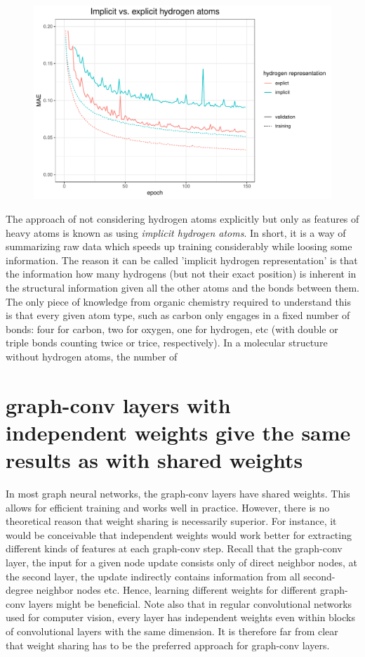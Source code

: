 \begin{figure}[H]
	\includegraphics[width=\linewidth]{figures/implict-hydrogens.pdf}
	
	\caption{}
	\label{fig:implicit-hydrogens}
\end{figure}


The approach of not considering hydrogen atoms explicitly but only as features of heavy atoms is known as using \textit{implicit hydrogen atoms}. In short, it is a way of summarizing raw data which speeds up training considerably while loosing some information. The reason it can be called 'implicit hydrogen representation' is that the information how many hydrogens (but not their exact position) is inherent in the structural information given all the other atoms and the bonds between them. The only piece of knowledge from organic chemistry required to understand this is that every given atom type, such as carbon only engages in a fixed number of bonds: four for carbon, two for oxygen, one for hydrogen, etc (with double or triple bonds counting twice or trice, respectively). In a molecular structure without hydrogen atoms, the number of 




\section{graph-conv layers with independent weights give the same results as with shared weights}


In most graph neural networks, the graph-conv layers have shared weights. This allows for efficient training and works well in practice. However, there is no theoretical reason that weight sharing is necessarily superior. For instance, it would be conceivable that independent weights would work better for extracting different kinds of features at each graph-conv step. Recall that the graph-conv layer, the input for a given node update consists only of direct neighbor nodes, at the second layer, the update indirectly contains information from all second-degree neighbor nodes etc. Hence, learning different weights for different graph-conv layers might be beneficial. Note also that in regular convolutional networks used for computer vision, every layer has independent weights even within blocks of convolutional layers with the same dimension. It is therefore far from clear that weight sharing has to be the preferred approach for graph-conv layers.

